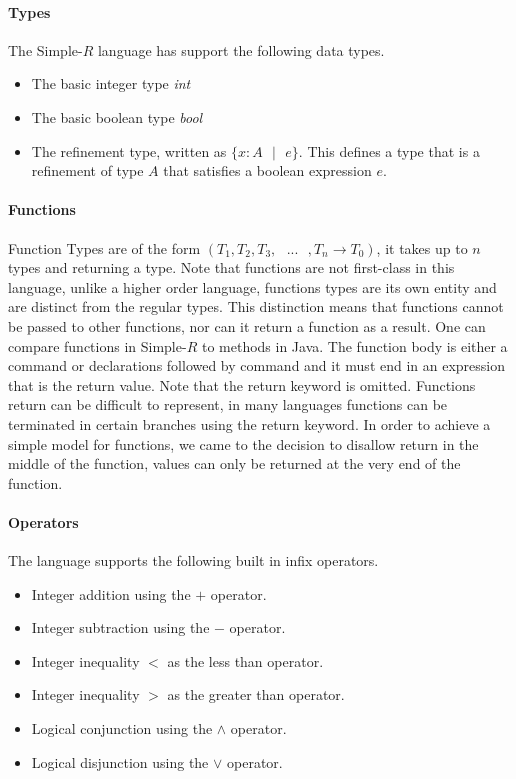 \documentclass[a4paper,12pt]{report}
\begin{document}
\paragraph{Types} The Simple-$R$ language has support the following data types. 
\begin{itemize}
  \item The basic integer type \textit{int}
  \item The basic boolean type \textit{bool}
  \item The refinement type, written as $\{x: A\text{ }|\text{ }e\}$. This defines 
  a type that is a refinement of type $A$ that satisfies a boolean expression $e$.
\end{itemize}

\paragraph{Functions}
Function Types are of the form $(T_1, T_2,T_3,\text{ }...\text{ },T_n \longrightarrow T_0)$, 
it takes up to $n$ types and returning a type. Note that functions are 
not first-class in this language, unlike a higher order 
language, functions types are its own entity and are distinct from the regular 
types. This distinction means that functions cannot be passed to 
other functions, nor can it return a function as a result. One can compare 
functions in Simple-$R$ to methods in Java. The function body is either a 
command or declarations followed by command and it must end in an 
expression that is the return value. Note that the 
return keyword is omitted. Functions return can be difficult to represent, in many 
languages functions can be terminated in certain branches using the 
return keyword. In order to achieve a simple model for functions, we came to 
the decision to disallow return in the middle of the function, values can 
only be returned at the very end of the function.

\paragraph{Operators}
The language supports the following built in infix operators.
\begin{itemize}
  \item Integer addition using the $+$ operator.
  \item Integer subtraction using the $-$ operator.
  \item Integer inequality $<$ as the less than operator.
  \item Integer inequality $>$ as the greater than operator.
  \item Logical conjunction using the $\wedge$ operator.
  \item Logical disjunction using the $\vee$ operator.
\end{itemize}
\end{document}
